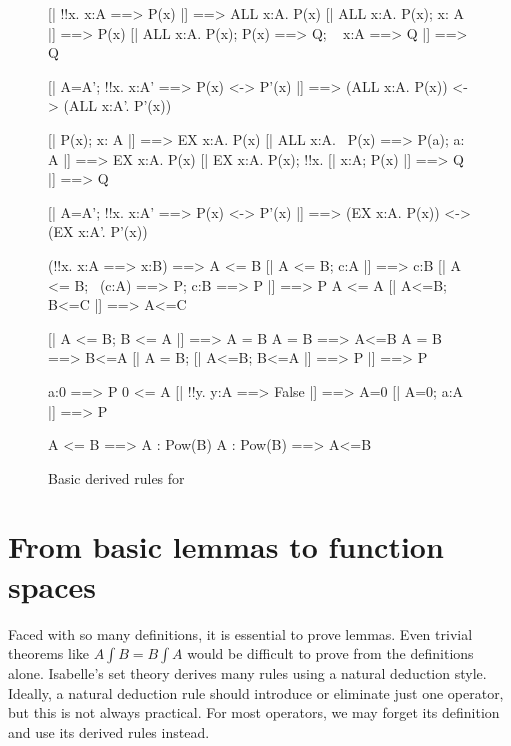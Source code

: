\begin{figure}
\begin{ttbox}
       [| !!x. x:A ==> P(x) |] ==> ALL x:A. P(x)
       [| ALL x:A. P(x);  x: A |] ==> P(x)
       [| ALL x:A. P(x);  P(x) ==> Q;  ~ x:A ==> Q |] ==> Q

   [| A=A';  !!x. x:A' ==> P(x) <-> P'(x) |] ==> 
            (ALL x:A. P(x)) <-> (ALL x:A'. P'(x))

        [| P(x);  x: A |] ==> EX x:A. P(x)
       [| ALL x:A. ~P(x) ==> P(a);  a: A |] ==> EX x:A. P(x)
        [| EX x:A. P(x);  !!x. [| x:A; P(x) |] ==> Q |] ==> Q

    [| A=A';  !!x. x:A' ==> P(x) <-> P'(x) |] ==> 
            (EX x:A. P(x)) <-> (EX x:A'. P'(x))

       (!!x. x:A ==> x:B) ==> A <= B
       [| A <= B;  c:A |] ==> c:B
      [| A <= B;  ~(c:A) ==> P;  c:B ==> P |] ==> P
   A <= A
  [| A<=B;  B<=C |] ==> A<=C

     [| A <= B;  B <= A |] ==> A = B
    A = B ==> A<=B
    A = B ==> B<=A
     [| A = B;  [| A<=B; B<=A |] ==> P |]  ==>  P

          a:0 ==> P
   0 <= A
        [| !!y. y:A ==> False |] ==> A=0
        [| A=0;  a:A |] ==> P

            A <= B ==> A : Pow(B)
            A : Pow(B)  ==>  A<=B
\end{ttbox}
\caption{Basic derived rules for {\ZF}} \label{zf-lemmas1}
\end{figure}


\section{From basic lemmas to function spaces}
Faced with so many definitions, it is essential to prove lemmas.  Even
trivial theorems like $A \int B = B \int A$ would be difficult to
prove from the definitions alone.  Isabelle's set theory derives many
rules using a natural deduction style.  Ideally, a natural deduction
rule should introduce or eliminate just one operator, but this is not
always practical.  For most operators, we may forget its definition
and use its derived rules instead.

